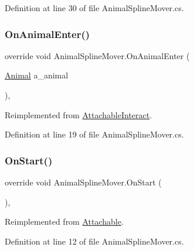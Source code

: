 Definition at line 30 of file Animal\+Spline\+Mover.\+cs.

\mbox{\label{class_animal_spline_mover_acadeba87020c2abcea749a5a522fff54}} 
\subsubsection{\texorpdfstring{On\+Animal\+Enter()}{OnAnimalEnter()}}
{\footnotesize\ttfamily override void Animal\+Spline\+Mover.\+On\+Animal\+Enter (\begin{DoxyParamCaption}\item[{\mbox{\hyperlink{class_animal}{Animal}}}]{a\+\_\+animal }\end{DoxyParamCaption})\hspace{0.3cm}{\ttfamily [protected]}, {\ttfamily [virtual]}}



Reimplemented from \mbox{\hyperlink{class_attachable_interact_a376127af23be5456604ee5ec39f02b9b}{Attachable\+Interact}}.



Definition at line 19 of file Animal\+Spline\+Mover.\+cs.

\mbox{\label{class_animal_spline_mover_aa088e9d7a088c6b2125a5388d13b95a7}} 
\subsubsection{\texorpdfstring{On\+Start()}{OnStart()}}
{\footnotesize\ttfamily override void Animal\+Spline\+Mover.\+On\+Start (\begin{DoxyParamCaption}{ }\end{DoxyParamCaption})\hspace{0.3cm}{\ttfamily [protected]}, {\ttfamily [virtual]}}



Reimplemented from \mbox{\hyperlink{class_attachable_a3c05c0b07b831881a7ab245057d34d30}{Attachable}}.



Definition at line 12 of file Animal\+Spline\+Mover.\+cs.



